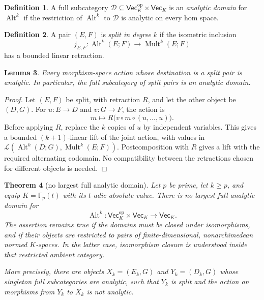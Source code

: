 \documentclass[11pt]{amsart}
\newtheorem{theorem}{Theorem}[section]
\newtheorem{lemma}[theorem]{Lemma}
\theoremstyle{definition}
\newtheorem{definition}[theorem]{Definition}
\theoremstyle{remark}
\numberwithin{equation}{section}
\newcommand{\F}{\mathbb F}
\newcommand{\cL}{\mathcal L}
\newcommand{\Alt}{\operatorname{Alt}}
\newcommand{\Mult}{\operatorname{Mult}}
\begin{document}
\begin{definition}\label{dom:definition}
A full subcategory $\mathcal D\subseteq\mathsf{Vec}_K^{\mathrm{op}}\times\mathsf{Vec}_K$ is an
\emph{analytic domain} for $\Alt^k$ if the restriction of $\Alt^k$ to $\mathcal D$ is analytic on every
hom space.
\end{definition}

\begin{definition}\label{dom:split-pair}
A pair $(E,F)$ is \emph{split in degree $k$} if the isometric inclusion
\[
j_{E,F}\colon\Alt^k(E;F)\longrightarrow\Mult^k(E;F)
\]
has a bounded linear retraction.
\end{definition}

\begin{lemma}\label{dom:split-incoming}
Every morphism-space action whose destination is a split pair is analytic. In particular, the full
subcategory of split pairs is an analytic domain.
\end{lemma}

\begin{proof}
Let $(E,F)$ be split, with retraction $R$, and let the other object be $(D,G)$. For $u\colon E\to D$
and $v\colon G\to F$, the action is
\[
m\longmapsto R\bigl(v\circ m\circ(u,\ldots,u)\bigr).
\]
Before applying $R$, replace the $k$ copies of $u$ by independent variables. This gives a bounded
$(k+1)$\nobreakdash-linear lift of the joint action, with values in
$\cL(\Alt^k(D;G),\Mult^k(E;F))$. Postcomposition with $R$ gives a lift with the required alternating
codomain. No compatibility between the retractions chosen for different objects is needed.
\end{proof}

\begin{theorem}[no largest full analytic domain]\label{dom:no-largest}
Let $p$ be prime, let $k\ge p$, and equip $K=\F_p(t)$ with its $t$\nobreakdash-adic absolute value.
There is no largest full analytic domain for
\[
\Alt^k\colon\mathsf{Vec}_K^{\mathrm{op}}\times\mathsf{Vec}_K\longrightarrow\mathsf{Vec}_K.
\]
The assertion remains true if the domains must be closed under isomorphisms, and if their objects are
restricted to pairs of finite-dimensional, nonarchimedean normed $K$\nobreakdash-spaces. In the latter case,
isomorphism closure is understood inside that restricted ambient category.

More precisely, there are objects $X_k=(E_k,G)$ and $Y_k=(D_k,G)$ whose singleton full subcategories
are analytic, such that $Y_k$ is split and the action on morphisms from $Y_k$ to $X_k$ is not analytic.
\end{theorem}
\end{document}
